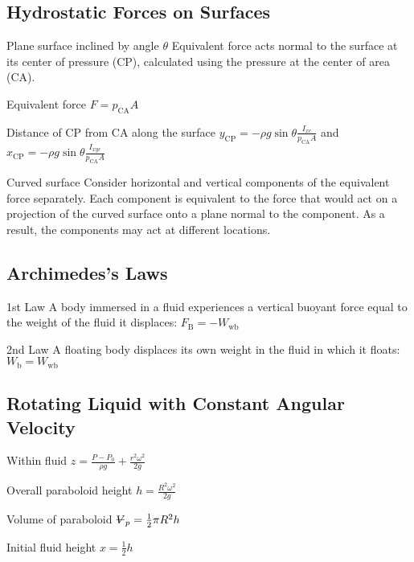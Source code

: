 \documentclass{article}
\begin{document}
\subsection{Hydrostatic Forces on Surfaces}
\begin{description*}
\item[Plane surface inclined by angle $\theta$] Equivalent force acts normal to the surface at its
  center of pressure (CP), calculated using the pressure at the center of area (CA).
  \begin{description*}
  \item[Equivalent force]
    \(F = p_\mathrm{CA}A\)
  \item[Distance of CP from CA along the surface]
    \(y_\mathrm{CP} = -\rho g \sin\theta\frac{I_{xc}}{p_\mathrm{CA}A}\) and
    \(x_\mathrm{CP} = -\rho g \sin\theta\frac{I_{xyc}}{p_\mathrm{CA}A}\)
  \end{description*}
\item[Curved surface] Consider horizontal and vertical components of the equivalent force
  separately. Each component is equivalent to the force that would act on a projection of the curved
  surface onto a plane normal to the component. As a result, the components may act at different
  locations.
\end{description*}

\subsection{Archimedes's Laws}
\begin{description*}
\item[1st Law] A body immersed in a fluid experiences a vertical buoyant force equal to the weight
  of the fluid it displaces: \(F_\mathrm{B} = -W_\mathrm{wb}\)
\item[2nd Law] A floating body displaces its own weight in the fluid in which it floats:
  \(W_\mathrm{b} = W_\mathrm{wb}\)
\end{description*}

\subsection{Rotating Liquid with Constant Angular Velocity}
\begin{description*}
\item[Within fluid]
  \(z = \frac{P-P_0}{\rho g} + \frac{r^2\omega^2}{2g}\)
\item[Overall paraboloid height]
  \(h = \frac{R^2\omega^2}{2g}\)
\item[Volume of paraboloid]
  \(\volsym_p = \frac{1}{2} \pi R^2 h\)
\item[Initial fluid height]
  \(x = \frac{1}{2} h\)
\end{description*}
\end{document}
